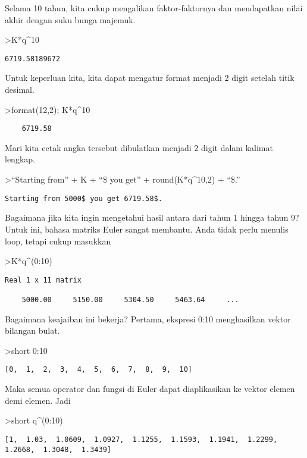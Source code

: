 \documentclass[
]{book}
\begin{document}
Selama 10 tahun, kita cukup mengalikan faktor-faktornya dan mendapatkan nilai akhir dengan suku bunga majemuk.

\textgreater K*q\^{}10

\begin{verbatim}
6719.58189672
\end{verbatim}

Untuk keperluan kita, kita dapat mengatur format menjadi 2 digit setelah titik desimal.

\textgreater format(12,2); K*q\^{}10

\begin{verbatim}
    6719.58 
\end{verbatim}

Mari kita cetak angka tersebut dibulatkan menjadi 2 digit dalam kalimat lengkap.

\textgreater{}``Starting from'' + K + ``\$ you get'' + round(K*q\^{}10,2) + ``\$.''

\begin{verbatim}
Starting from 5000$ you get 6719.58$.
\end{verbatim}

Bagaimana jika kita ingin mengetahui hasil antara dari tahun 1 hingga tahun 9? Untuk ini, bahasa matriks Euler sangat membantu. Anda tidak perlu menulis loop, tetapi cukup masukkan

\textgreater K*q\^{}(0:10)

\begin{verbatim}
Real 1 x 11 matrix

    5000.00     5150.00     5304.50     5463.64     ...
\end{verbatim}

Bagaimana keajaiban ini bekerja? Pertama, ekspresi 0:10 menghasilkan vektor bilangan bulat.

\textgreater short 0:10

\begin{verbatim}
[0,  1,  2,  3,  4,  5,  6,  7,  8,  9,  10]
\end{verbatim}

Maka semua operator dan fungsi di Euler dapat diaplikasikan ke vektor elemen demi elemen. Jadi

\textgreater short q\^{}(0:10)

\begin{verbatim}
[1,  1.03,  1.0609,  1.0927,  1.1255,  1.1593,  1.1941,  1.2299,
1.2668,  1.3048,  1.3439]
\end{verbatim}
\end{document}
